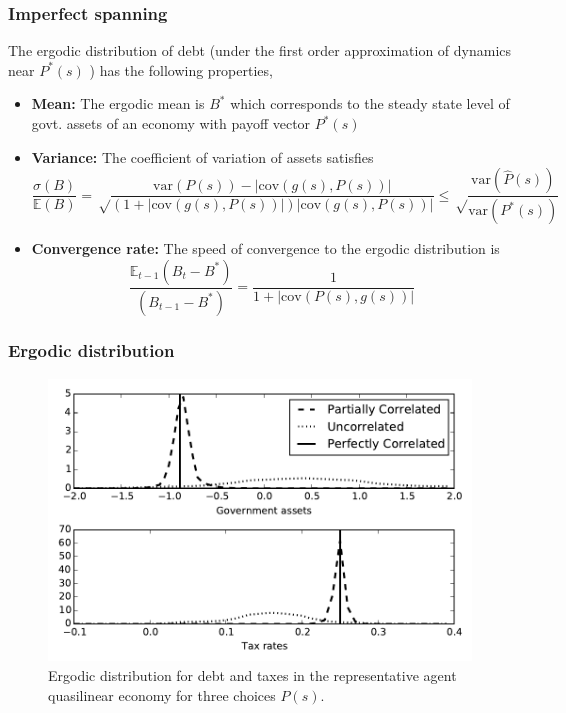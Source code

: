 \documentclass{beamer}
\newcommand{\EE}{\mathbb E}
\newcommand{\var}{\mathrm{var}}
\newcommand{\cov}{\mathrm{cov}}
\begin{document}
\begin{frame}%

\frametitle{Imperfect spanning}
\begin{theorem}

The ergodic distribution of debt (under the first order approximation of dynamics near $P^*(s)$ ) has the following properties,
\begin{itemize}
 \item \textbf{Mean:} The ergodic mean is $B^*$ which corresponds to the steady state level of govt. assets of an economy with payoff vector $P^*(s)$
  
 \item \textbf{Variance:} The coefficient of variation of assets satisfies
  \[
    \frac{\sigma(B)}{\mathbb E(B)} = \sqrt\frac{\var(P(s)) - |\cov(g(s),P(s))|}{(1+|\cov(g(s),P(s))|)|\cov(g(s),P(s))|}\leq\sqrt\frac{\var(\hat{P}(s))}{\var(P^*(s))}
  \]
  \item \textbf{Convergence rate:} The speed of convergence to the ergodic distribution is
  \[
    \frac{\EE_{t-1}(B_t-B^*)}{(B_{t-1} - B^*)} = \frac1{1+|\cov(P(s),g(s))|}
  \]

\end{itemize}
  

\end{theorem}

\end{frame}%

\begin{frame}
\frametitle{Ergodic distribution} 
\begin{figure}[htp]
 \centering
 \includegraphics[width=5in]{plots/ErgodicQL.pdf}
 \caption{Ergodic distribution for debt and taxes in the representative agent quasilinear economy for three choices $P(s)$.}
 \label{fig: ergodic distribution ql}
 \end{figure}

\end{frame}
\end{document}

